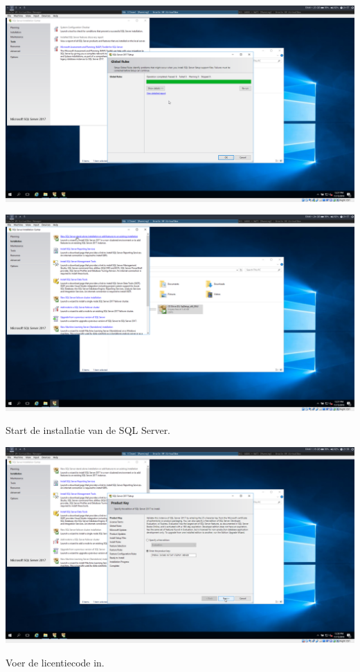 \documentclass[a4paper]{article}
\begin{document}
\begin{center}
	\includegraphics[width=15cm]{Pictures/SQL/1542315456.png}
\end{center}
\begin{center}
	\includegraphics[width=15cm]{Pictures/SQL/1542315469.png}
	
	Start de installatie van de SQL Server.
\end{center}
\begin{center}
	\includegraphics[width=15cm]{Pictures/SQL/1542315497.png}
	
	Voer de licentiecode in.
\end{center}
\end{document}
